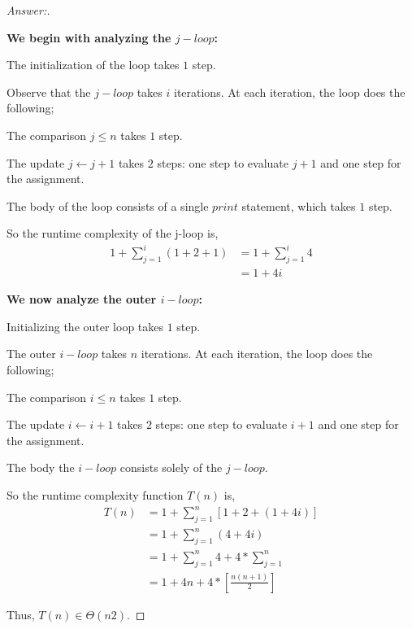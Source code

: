 \documentclass[11pt]{article}
\theoremstyle{definition}
\theoremstyle{definition}
\theoremstyle{definition}
\begin{document}
\begin{proof}[Answer:] \

\item \textbf{We begin with analyzing the $j-loop$:}
\item The initialization of the loop takes $1$ step.
\item Observe that the $j-loop$ takes $i$ iterations. At each iteration, the loop does the following;
\item \hspace*{10mm} The comparison $j \leq n$ takes $1$ step.
\item \hspace*{10mm} The update $j \leftarrow j + 1$ takes $2$ steps: one step to evaluate $j + 1$ and one step for the assignment.
\item \hspace*{10mm} The body of the loop consists of a single $print$ statement, which takes $1$ step.
\item So the runtime complexity of the j-loop is,
\begin{align*}
1 + \sum_{j=1}^{i} (1 + 2 + 1) &= 1 +  \sum_{j=1}^{i} 4 \\
&= 1 + 4i
\end{align*}

\item \textbf{We now analyze the outer $i-loop$:}
\item Initializing the outer loop takes $1$ step.
\item The outer $i-loop$ takes $n$ iterations. At each iteration, the loop does the following;
\item \hspace*{10mm} The comparison $i \leq n$ takes $1$ step.
\item \hspace*{10mm} The update $i \leftarrow i + 1$ takes $2$ steps: one step to evaluate $i + 1$ and one step for the assignment.
\item \hspace*{10mm} The body the $i-loop$ consists solely of the $j-loop$.
\item So the runtime complexity function $T(n)$ is,
\begin{align*}
T(n) &= 1 + \sum_{j=1}^{n} [1 + 2 + (1 + 4i)]\\
&= 1 + \sum_{j=1}^{n} (4 + 4i) \\
&=  1 + \sum_{j=1}^{n} 4 + 4 * \sum_{j=1}^{n} \\
&=  1 + 4n + 4 * [\frac{n(n + 1)}{2}]
\end{align*}

\item Thus, $T(n) \in \Theta(n2)$.

\end{proof}
\end{document}
